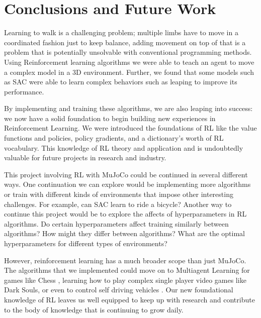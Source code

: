 \documentclass[conference]{IEEEtran}
\begin{document}
\section{Conclusions and Future Work}

Learning to walk is a challenging problem; multiple limbs have to move in a coordinated fashion just to keep balance, adding movement on top of that is a problem that is potentially unsolvable with conventional programming methods. Using Reinforcement learning algorithms we were able to teach an agent to move a complex model in a 3D environment. Further, we found that some models such as SAC were able to learn complex behaviors such as leaping to improve its performance.

By implementing and training these algorithms, we are also leaping into success: we now have a solid foundation to begin building new experiences in Reinforcement Learning. We were introduced the foundations of RL like the value functions and policies, policy gradients, and a dictionary's worth of RL vocabulary. This knowledge of RL theory and application and is undoubtedly valuable for future projects in research and industry.

This project involving RL with MuJoCo could be continued in several different ways. One continuation we can explore would be implementing more algorithms or train with different kinds of environments that impose other interesting challenges. For example, can SAC learn to ride a bicycle? Another way to continue this project would be to explore the affects of hyperparameters in RL algorithms. Do certain hyperparameters affect training similarly between algorithms? How might they differ between algorithms? What are the optimal hyperparameters for different types of environments?

However, reinforcement learning has a much broader scope than just MuJoCo. The algorithms that we implemented could move on to Multiagent Learning for games like Chess \cite{multiagent}, learning how to play complex single player video games like Dark Souls, or even to control self driving vehicles \cite{self_driving}. Our new foundational knowledge of RL leaves us well equipped to keep up with research and contribute to the body of knowledge that is continuing to grow daily.



\end{document}
